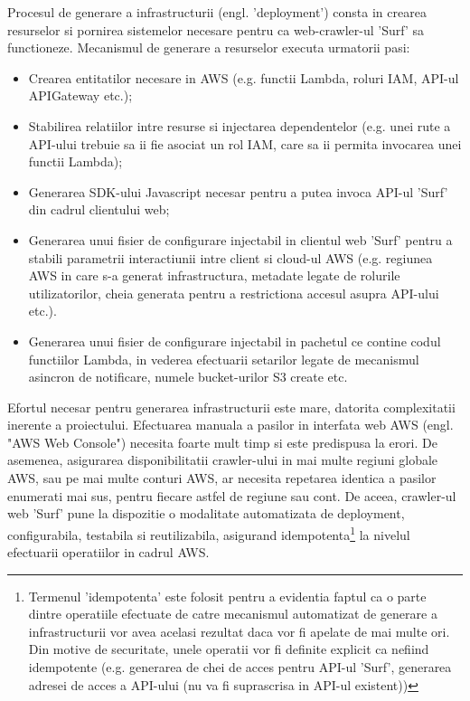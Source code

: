 \newcommand{\descriereIdempotenta}{Termenul 'idempotenta' este folosit pentru a evidentia faptul ca o parte dintre operatiile efectuate de catre mecanismul automatizat de generare a infrastructurii vor avea acelasi rezultat daca vor fi apelate de mai multe ori. Din motive de securitate, unele operatii vor fi definite explicit ca nefiind idempotente (e.g. generarea de chei de acces pentru API-ul 'Surf', generarea adresei de acces a API-ului (nu va fi suprascrisa in API-ul existent)) }

Procesul de generare a infrastructurii (engl. 'deployment') consta in crearea resurselor si pornirea sistemelor necesare pentru ca web-crawler-ul 'Surf' sa functioneze. Mecanismul de generare a resurselor executa urmatorii pasi:

\begin{itemize}

	\item{Crearea entitatilor necesare in AWS (e.g. functii Lambda, roluri IAM, API-ul APIGateway etc.);}
	
	\item{Stabilirea relatiilor intre resurse si injectarea dependentelor (e.g. unei rute a API-ului trebuie sa ii fie asociat un rol IAM, care sa ii permita invocarea unei functii Lambda);}
	
	\item{Generarea SDK-ului Javascript necesar pentru a putea invoca API-ul 'Surf' din cadrul clientului web;}
	
	\item{Generarea unui fisier de configurare injectabil in clientul web 'Surf' pentru a stabili parametrii interactiunii intre client si cloud-ul AWS (e.g. regiunea AWS in care s-a generat infrastructura, metadate legate de rolurile utilizatorilor, cheia generata pentru a restrictiona accesul asupra API-ului etc.).}

  \item{Generarea unui fisier de configurare injectabil in pachetul ce contine codul functiilor Lambda, in vederea efectuarii setarilor legate de mecanismul asincron de notificare, numele bucket-urilor S3 create etc.}
\end{itemize}

Efortul necesar pentru generarea infrastructurii este mare, datorita complexitatii inerente a proiectului. Efectuarea manuala a pasilor in interfata web AWS (engl. "AWS Web Console") necesita foarte mult timp si este predispusa la erori. De asemenea, asigurarea disponibilitatii crawler-ului in mai multe regiuni globale AWS, sau pe mai multe conturi AWS, ar necesita repetarea identica a pasilor enumerati mai sus, pentru fiecare astfel de regiune sau cont. De aceea, crawler-ul web 'Surf' pune la dispozitie o modalitate automatizata de deployment, configurabila, testabila si reutilizabila, asigurand idempotenta\footnote{\descriereIdempotenta} la nivelul efectuarii operatiilor in cadrul AWS.

